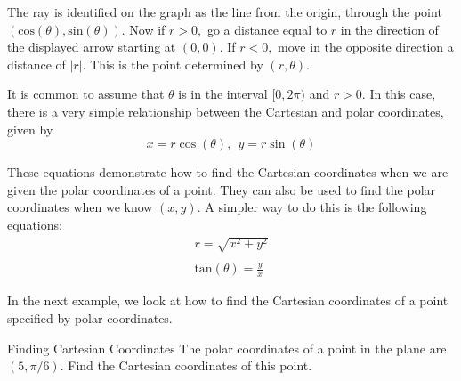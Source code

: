 The ray is identified on the graph as the line from the origin, through the point $(\mbox{cos}(\theta),\mbox{sin}(\theta))$. Now if $r>0,$ go a distance
equal to $r$ in the direction of the displayed arrow starting at $(0,0)$. If 
$r<0,$ move in the opposite direction a distance of $\left\vert r\right\vert 
$. This is the point determined by $\left( r,\theta \right)$.

It is common to assume that $\theta $ is in the interval $
[0,2\pi )$ and $r>0.$ In this case, there is a very simple relationship
between the Cartesian and polar coordinates, given by
\begin{equation}
x=r\cos \left( \theta \right) ,\ \ y=r\sin \left( \theta \right) 
\label{cartpolcoord}
\end{equation}

These equations demonstrate how to find the Cartesian coordinates when we are given the polar coordinates of a point. They can also be used to find the polar coordinates when we know $\left( x, y \right)$. A simpler way to do this is the following equations:
\begin{equation}
\begin{array}{l}
r = \sqrt{x^2 + y^2} \\
\\
\mbox{tan} \left(\theta\right) = \frac{y}{x}
\end{array}
\label{polcartcoord}
\end{equation}

In the next example, we look at how to find the Cartesian coordinates of a point specified by polar coordinates. 

\begin{example}{Finding Cartesian Coordinates}
The polar coordinates of a point in the plane are $\left( 5,\pi /6\right) $.
Find the Cartesian coordinates of this point.
\end{example}

